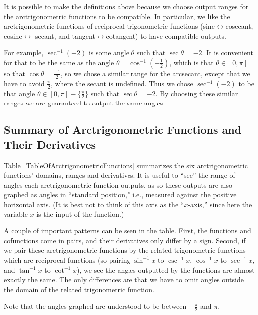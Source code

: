 It is possible to make the definitions above because
we choose output ranges for the arctrigonometric functions
to be compatible.  In particular, we like the arctrigonometric
functions of reciprocal trigonometric functions
(sine$\leftrightarrow$cosecant, cosine$\leftrightarrow$ secant,
and tangent$\leftrightarrow$cotangent) to have compatible
outputs.

For example, $\sec^{-1}(-2)$ is some angle $\theta$ such that $\sec\theta=-2$.
It is convenient for that to be the same as the
angle $\theta=\cos^{-1}(-\frac12)$, which is
that $\theta\in[0,\pi]$ so that $\cos\theta=\frac{-1}2$,
so we chose a similar range for the arcsecant,
except that we have to avoid $\frac{\pi}2$, where the 
secant is undefined.  Thus we chose
$\sec^{-1}(-2)$ to be that angle $\theta\in[0,\pi]-\{\frac{\pi}{2}\}$
such that $\sec\theta=-2$.  By choosing these similar ranges
we are guaranteed to output the same angles.






\subsection{Summary of Arctrigonometric Functions and Their Derivatives}
Table~\ref{TableOfArctrigonometricFunctions}
summarizes  the six arctrigonometric functions' domains,
ranges and derivatives. 
It is useful to ``see'' the range
of angles each arctrigonometric function outputs, as so these
outputs are also graphed as angles in ``standard position,''
i.e., measured against the positive horizontal axis.
(It is best not to think of this axis as the ``$x$-axis,''
since here the variable $x$ is the input of the function.)

A couple of important patterns can be seen in the table.
First, the functions and cofunctions come in pairs, and
their derivatives only differ by a sign.  Second,
if we pair these arctrigonometric functions by
the related trigonometric functions which are reciprocal
functions (so pairing $\sin^{-1}x$ to $\csc^{-1}x$,
 $\cos^{-1}x$ to $\sec^{-1}x$, and $\tan^{-1}x$ to $\cot^{-1}x$),
we see the angles outputted by the functions are almost
exactly the same.  The only differences are that we have
to omit angles outside the domain of the related trigonometric
function.

Note that the angles graphed are understood to be between
$-\frac{\pi}2$ and $\pi$.

